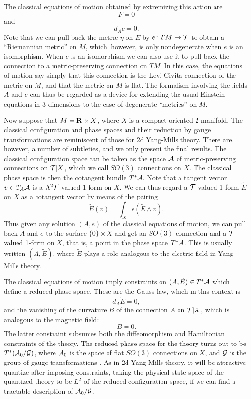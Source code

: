 \documentclass[12pt]{article}
\newcommand{\eps}{\epsilon}
\newcommand{\maps}{\colon}
\newcommand{\A}{{\cal A}}
\newcommand{\G}{{\cal G}}
\newcommand{\T}{{\cal T}}
\newcommand{\R}{{\bf R}}
\begin{document}
The classical equations of motion obtained by extremizing this action are
\[            F = 0 \]
and
\[            d_A e = 0 .\]
Note that we can pull back the metric $\eta$ on $E$ by $e \maps TM \to \T$
to obtain a ``Riemannian metric'' on $M$, which, however, is only
nondegenerate when $e$ is an isomorphism.  When $e$ is an isomorphism we
can also use it to pull back the connection to a metric-preserving
connection on $TM$.  In this case, the equations of motion say simply that
this connection is the Levi-Civita connection of the metric on $M$,
and that the metric on $M$ is flat.
The formalism involving the fields $A$ and $e$ can thus be regarded as a
device for extending the usual Einstein equations in 3 dimensions to the
case of degenerate ``metrics'' on $M$.

Now suppose that $M = \R \times X$, where $X$ is a compact oriented
2-manifold.  The classical configuration and phase spaces and their
reduction by gauge transformations are reminiscent of those for 2d
Yang-Mills theory.  There are, however, a number of subtleties, and we
only present the final results.   The
classical configuration space can be taken as the space $\A$ of
metric-preserving connections on $\T|X$, which we call $SO(3)$ connections
on $X$.  The classical phase space is then the cotangent bundle $T^\ast \A$.
Note that a tangent vector $v \in T_A\A$ is a
$\Lambda^2 \T$-valued 1-form on $X$.  We can thus regard a $\T$-valued
1-form $\tilde E$ on $X$ as a cotangent vector by means of the pairing
\[         \tilde E(v) = \int_X \eps(\tilde E \wedge v) .\]
Thus given any solution $(A,e)$ of the
classical equations of motion, we can pull back $A$
and $e$ to the surface $\{0\} \times X$ and get an $SO(3)$ connection and a
$\T$-valued 1-form on $X$, that is, a point in the phase space $T^\ast \A$.
This is usually written $(A,\tilde E)$, where $\tilde E$ plays a role
analogous to the electric field in Yang-Mills theory.

The classical equations of motion imply constraints on
$(A,\tilde E) \in T^\ast \A$ which define a reduced phase space.
These are the Gauss law, which in this context is
\[   d_A \tilde E = 0,\]
and the vanishing of the curvature $B$ of the connection $A$ on $\T|X$,
which is analogous to the magnetic field:
\[     B = 0.\]
The latter constraint subsumes both the diffeomorphism and Hamiltonian
constraints of the theory.
The reduced phase space for the theory turns out to be
 $T^\ast(\A_0/\G)$, where $\A_0$ is the
space of flat $SO(3)$ connections on $X$, and $\G$ is the group of
gauge transformations \cite{AHRSS}.
As in 2d Yang-Mills theory, it will be attractive quantize after
imposing constraints, taking the physical state space of the
quantized theory to be $L^2$ of the reduced configuration space, if we can
find a tractable description of $\A_0/\G$.
\end{document}
